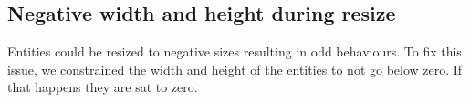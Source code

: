 \subsection{Negative width and height during resize}
Entities could be resized to negative sizes resulting in odd behaviours. 
To fix this issue, we constrained the width and height of the entities to not go below zero. 
If that happens they are sat to zero.